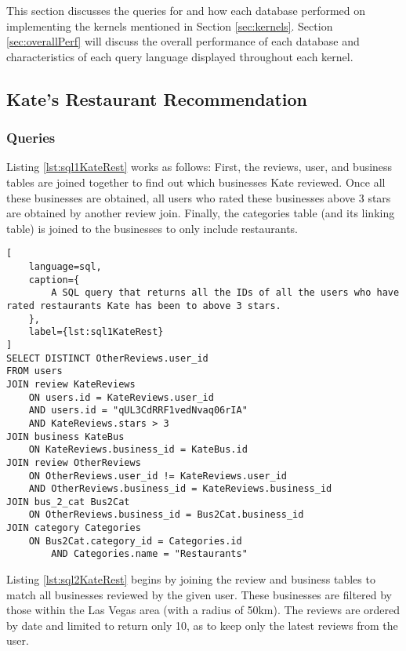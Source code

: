 This section discusses the queries for and how each database performed on implementing the kernels mentioned in Section \ref{sec:kernels}. Section \ref{sec:overallPerf} will discuss the overall performance of each database and characteristics of each query language displayed throughout each kernel.

\subsection{Kate's Restaurant Recommendation}

\subsubsection{Queries}


Listing \ref{lst:sql1KateRest} works as follows: First, the reviews, user, and business tables are joined together to find out which businesses Kate reviewed. Once all these businesses are obtained, all users who rated these businesses above 3 stars are obtained by another review join. Finally, the categories table (and its linking table) is joined to the businesses to only include restaurants.

\begin{lstlisting}[
    language=sql,
    caption={
        A SQL query that returns all the IDs of all the users who have rated restaurants Kate has been to above 3 stars.
    },
    label={lst:sql1KateRest}
]
SELECT DISTINCT OtherReviews.user_id
FROM users 
JOIN review KateReviews 
    ON users.id = KateReviews.user_id 
    AND users.id = "qUL3CdRRF1vedNvaq06rIA"
    AND KateReviews.stars > 3 
JOIN business KateBus
    ON KateReviews.business_id = KateBus.id
JOIN review OtherReviews
    ON OtherReviews.user_id != KateReviews.user_id 
    AND OtherReviews.business_id = KateReviews.business_id
JOIN bus_2_cat Bus2Cat
    ON OtherReviews.business_id = Bus2Cat.business_id
JOIN category Categories
    ON Bus2Cat.category_id = Categories.id 
        AND Categories.name = "Restaurants"
\end{lstlisting}

Listing \ref{lst:sql2KateRest} begins by joining the review and business tables to match all businesses reviewed by the given user. These businesses are filtered by those within the Las Vegas area (with a radius of 50km). The reviews are ordered by date and limited to return only 10, as to keep only the latest reviews from the user.

